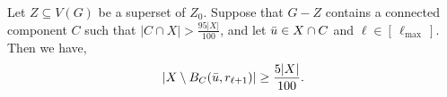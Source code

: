 
\begin{lemma}\label{lem:good_layer_many_outside}
    Let $Z \subseteq V(G)$ be a superset of $Z_0$. Suppose that $G - Z$ contains a connected component $C$ such that $|C \cap X| > \frac{95|X|}{100}$, and let $\Bar{u} \in X \cap C$ and $\ell \in [\,\ell_{\max}\,]$. Then we have,
    $$
    \left| X \setminus B_C(\Bar{u}, r_{\ell+1}) \right| \geq \frac{5|X|}{100}.
    $$
\end{lemma}
